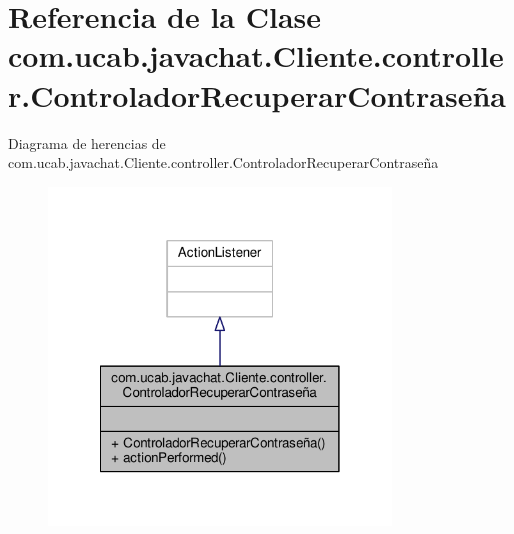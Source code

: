 \hypertarget{classcom_1_1ucab_1_1javachat_1_1_cliente_1_1controller_1_1_controlador_recuperar_contrase_xC3_xB1a}{\section{Referencia de la Clase com.\-ucab.\-javachat.\-Cliente.\-controller.\-Controlador\-Recuperar\-Contraseña}
\label{classcom_1_1ucab_1_1javachat_1_1_cliente_1_1controller_1_1_controlador_recuperar_contrase_xC3_xB1a}
}


Diagrama de herencias de com.\-ucab.\-javachat.\-Cliente.\-controller.\-Controlador\-Recuperar\-Contraseña
\nopagebreak
\begin{figure}[H]
\begin{center}
\leavevmode
\includegraphics[width=258pt]{d0/da0/classcom_1_1ucab_1_1javachat_1_1_cliente_1_1controller_1_1_controlador_recuperar_contrase_xC3_xB1a__inherit__graph}
\end{center}
\end{figure}


